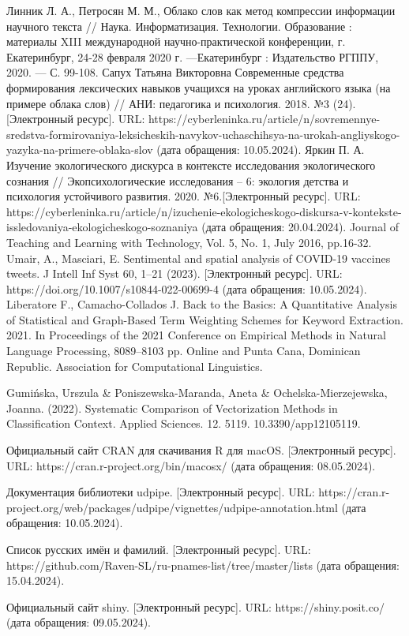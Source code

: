 \documentclass[bachelor, och, diploma ]{SCWorks}
\begin{document}
%
\begin{thebibliography}{99}
  Линник Л. А., Петросян М. М., Облако слов как метод компрессии информации научного текста // Наука. Информатизация. Технологии. Образование : материалы XIII международной научно-практической конференции, г. Екатеринбург, 24-28 февраля 2020 г. ---Екатеринбург : Издательство РГППУ, 2020. --- С. 99-108. 
 Сапух Татьяна Викторовна Современные средства формирования лексических навыков учащихся на уроках английского языка (на примере облака слов) // АНИ: педагогика и психология. 2018. №3 (24).[Электронный ресурс]. URL: https://cyberleninka.ru/article/n/sovremennye-sredstva-formirovaniya-leksicheskih-navykov-uchaschihsya-na-urokah-angliyskogo-yazyka-na-primere-oblaka-slov (дата обращения: 10.05.2024).
 Яркин П. А. Изучение экологического дискурса в контексте исследования экологического сознания // Экопсихологические исследования – 6: экология детства и психология устойчивого развития. 2020. №6.[Электронный ресурс]. URL: https://cyberleninka.ru/article/n/izuchenie-ekologicheskogo-diskursa-v-kontekste-issledovaniya-ekologicheskogo-soznaniya (дата обращения: 20.04.2024).
 Journal of Teaching and Learning with Technology, Vol. 5, No. 1, July 2016, pp.16-32.
 Umair, A., Masciari, E. Sentimental and spatial analysis of COVID-19 vaccines tweets. J Intell Inf Syst 60, 1–21 (2023). [Электронный ресурс]. URL: https://doi.org/10.1007/s10844-022-00699-4 (дата обращения: 10.05.2024).
 Liberatore F., Camacho-Collados J. Back to the Basics: A Quantitative Analysis of Statistical and Graph-Based Term Weighting Schemes for Keyword Extraction. 2021. In Proceedings of the 2021 Conference on Empirical Methods in Natural Language Processing, 8089–8103 pp. Online and Punta Cana, Dominican Republic. Association for Computational Linguistics.

Gumińska, Urszula \& Poniszewska-Maranda, Aneta \& Ochelska-Mierzejewska, Joanna. (2022). Systematic Comparison of Vectorization Methods in Classification Context. Applied Sciences. 12. 5119. 10.3390/app12105119.  

Официальный сайт CRAN для скачивания R для macOS. [Электронный ресурс]. URL:   https://cran.r-project.org/bin/macosx/ (дата обращения: 08.05.2024).







Документация библиотеки udpipe. [Электронный ресурс]. URL: https://cran.r-project.org/web/packages/udpipe/vignettes/udpipe-annotation.html (дата обращения: 10.05.2024).



  Список русских имён и фамилий. [Электронный ресурс]. URL: https://github.com/Raven-SL/ru-pnames-list/tree/master/lists (дата обращения: 15.04.2024).


 Официальный сайт shiny. [Электронный ресурс]. URL: https://shiny.posit.co/ (дата обращения: 09.05.2024).

\end{thebibliography}
\end{document}
